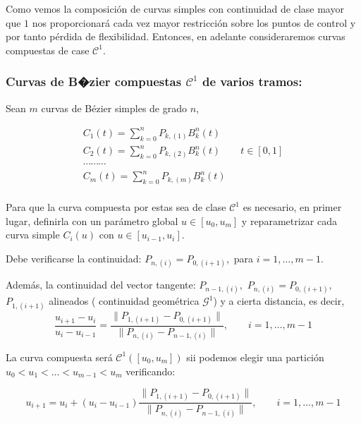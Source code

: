 \documentclass[ebook,oneside]{memoir}
\begin{document}
\vspace{0.2cm}

Como vemos la composici\'{o}n de curvas simples con continuidad de clase mayor que $1$ nos proporcionar\'{a} cada vez mayor restricci\'{o}n sobre los puntos de control y por tanto p\'{e}rdida de flexibilidad. Entonces, en adelante consideraremos curvas compuestas de case ${\mathcal  C}^1$.

\subsubsection{Curvas de B�zier compuestas ${\mathcal  C}^1$ de varios tramos:}

Sean $m$ curvas de B\'{e}zier simples de grado $n$,

$$\begin{array}{l}
C_1(t)=\sum_{k=0}^n P_{k, (1)} B_k^n(t)\\
C_2(t)=\sum_{k=0}^n P_{k, (2)} B_k^n(t) \quad \quad t\in [0,1]\\
\cdots \cdots \cdots\\
C_m(t)=\sum_{k=0}^n P_{k, (m)} B_k^n(t)\\
\end{array}$$

Para que la curva compuesta por estas sea de clase ${\mathcal  C}^1$ es necesario, en primer lugar, definirla con un par\'{a}metro
global $u\in [u_0,u_m]$ y reparametrizar cada curva simple $C_i(u)$ con $u\in [u_{i-1},u_i]$.

Debe verificarse la continuidad: $P_{n, (i)}=P_{0,(i+1)},$ para $i=1,\ldots,m-1$.

Adem\'{a}s, la continuidad del vector tangente: $P_{n-1, (i)},$ $P_{n, (i)}=P_{0,(i+1)},$ $P_{1,(i+1)}$ alineados ( continuidad geom\'{e}trica ${\mathcal  G}^1$) y a cierta distancia, es decir,
$$\frac{u_{i+1}-u_i}{u_i-u_{i-1}} = \frac{\parallel P_{1,(i+1)}-P_{0,(i+1)}\parallel}{\parallel P_{n, (i)}-P_{n-1,(i)} \parallel},\quad \quad i=1,\ldots,m-1$$

\vspace{0.2cm}

La curva compuesta ser\'{a} ${\mathcal  C}^1([u_0,u_m])$ sii podemos elegir una partici\'{o}n $u_0<u_1<\ldots<u_{m-1}<u_m$ verificando:

$$u_{i+1}=u_i+(u_i-u_{i-1}) \frac{\parallel P_{1,(i+1)}-P_{0,(i+1)}\parallel}{\parallel P_{n, (i)}-P_{n-1,(i)}
\parallel},\quad \quad i=1,\ldots,m-1$$

\vspace{0.5cm}
\end{document}
